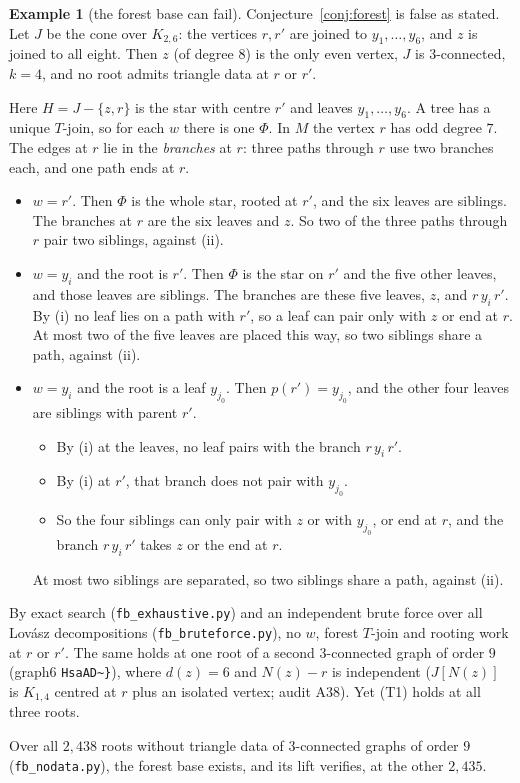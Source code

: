 \documentclass[11pt]{amsart}
\theoremstyle{definition}
\newtheorem{example}[theorem]{Example}
\begin{document}
\begin{example}[the forest base can fail]\label{ex:forestfail}
Conjecture~\ref{conj:forest} is false as stated. Let $J$ be the cone over $K_{2,6}$: the vertices
$r,r'$ are joined to $y_1,\dots,y_6$, and $z$ is joined to all eight. Then $z$ (of degree $8$) is the
only even vertex, $J$ is $3$-connected, $k=4$, and no root admits triangle data at $r$ or $r'$.

Here $H=J-\{z,r\}$ is the star with centre $r'$ and leaves $y_1,\dots,y_6$. A tree has a unique
$T$-join, so for each $w$ there is one $\Phi$. In $M$ the vertex $r$ has odd degree $7$. The edges at $r$
lie in the \emph{branches} at $r$: three paths through $r$ use two branches each, and one path ends at
$r$.
\begin{itemize}[leftmargin=*]
\item $w=r'$. Then $\Phi$ is the whole star, rooted at $r'$, and the six leaves are siblings. The
branches at $r$ are the six leaves and $z$. So two of the three paths through $r$ pair two siblings,
against (ii).
\item $w=y_i$ and the root is $r'$. Then $\Phi$ is the star on $r'$ and the five other leaves, and
those leaves are siblings. The branches are these five leaves, $z$, and $r\,y_i\,r'$. By (i) no leaf
lies on a path with $r'$, so a leaf can pair only with $z$ or end at $r$. At most two of the five
leaves are placed this way, so two siblings share a path, against (ii).
\item $w=y_i$ and the root is a leaf $y_{j_0}$. Then $p(r')=y_{j_0}$, and the other four leaves are
siblings with parent $r'$.
\begin{itemize}
\item By (i) at the leaves, no leaf pairs with the branch $r\,y_i\,r'$.
\item By (i) at $r'$, that branch does not pair with $y_{j_0}$.
\item So the four siblings can only pair with $z$ or with $y_{j_0}$, or end at $r$, and the branch
$r\,y_i\,r'$ takes $z$ or the end at $r$.
\end{itemize}
At most two siblings are separated, so two siblings share a path, against (ii).
\end{itemize}
By exact search (\texttt{fb\_exhaustive.py}) and an independent brute force over all Lov\'asz
decompositions (\texttt{fb\_bruteforce.py}), no $w$, forest $T$-join and rooting work at $r$ or $r'$.
The same holds at one root of a second $3$-connected graph of order $9$ (graph6 \texttt{HsaAD\textasciitilde\}}),
where $d(z)=6$ and $N(z)-r$ is independent ($J[N(z)]$ is $K_{1,4}$ centred at $r$ plus an isolated vertex; audit A38). Yet (T1) holds at all three roots.

Over all $2{,}438$ roots without triangle data of $3$-connected graphs of order $9$
(\texttt{fb\_nodata.py}), the forest base exists, and its lift verifies, at the other $2{,}435$.
\end{example}
\end{document}
